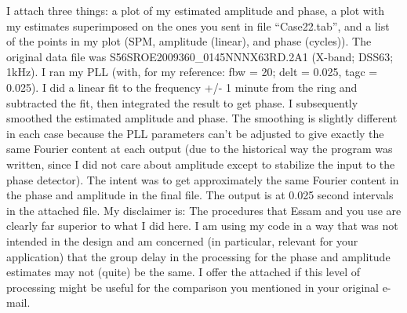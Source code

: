 \documentclass[crop=false,class=article,oneside]{standalone}
\begin{document}
I attach three things:  a plot of my estimated amplitude and phase, a plot with my estimates superimposed on the ones you sent in file “Case22.tab”, and a list of the points in my plot (SPM, amplitude (linear), and phase (cycles)).  The original data file was S56SROE2009360\_0145NNNX63RD.2A1 (X-band; DSS63; 1kHz). I ran my PLL (with, for my reference: fbw = 20; delt = 0.025, tagc = 0.025). I did a linear fit to the frequency +/- 1 minute from the ring and subtracted the fit, then integrated the result to get phase.  I subsequently smoothed the estimated amplitude and phase.  The smoothing is slightly different in each case because the PLL parameters can’t be adjusted to give exactly the same Fourier content at each output (due to the historical way the program was written, since I did not care about amplitude except to stabilize the input to the phase detector).   The intent was to get approximately the same Fourier content in the phase and amplitude in the final file. The output is at 0.025 second intervals in the attached file. My disclaimer is:  The procedures that Essam and you use are clearly far superior to what I did here.  I am using my code in a way that was not intended in the design and am concerned (in particular, relevant for your application) that the group delay in the processing for the phase and amplitude estimates may not (quite) be the same.  I offer the attached if this level of processing might be useful for the comparison you mentioned in your original e-mail. 
\end{document}
